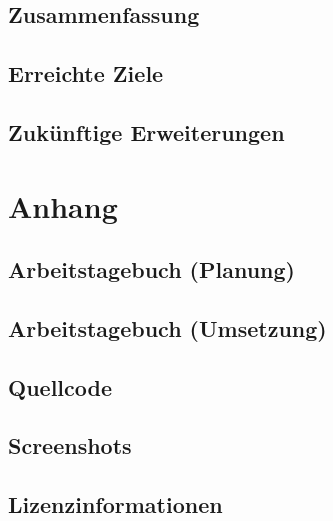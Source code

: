 \documentclass[a4paper]{article}
\begin{document}
\subsection{Zusammenfassung}

\subsection{Erreichte Ziele}

\subsection{Zukünftige Erweiterungen}

\section{Anhang}

\subsection{Arbeitstagebuch (Planung)}

\subsection{Arbeitstagebuch (Umsetzung)}

\subsection{Quellcode}

\subsection{Screenshots}

\subsection{Lizenzinformationen}
\end{document}
